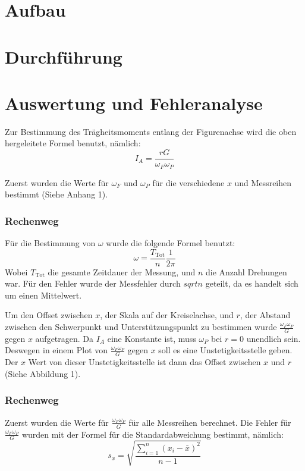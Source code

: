 \documentclass[11pt,a4paper]{article} %
\begin{document}
\section{Aufbau}

\section{Durchführung}

\section{Auswertung und Fehleranalyse}
Zur Bestimmung des Trägheitsmoments entlang der Figurenachse wird die oben hergeleitete Formel benutzt, nämlich:
$$I_A = \frac{rG}{\omega_F \omega_P}$$

Zuerst wurden die Werte für $\omega_F$ und $\omega_P$ für die verschiedene $x$ und Messreihen bestimmt (Siehe Anhang 1). 
\begin{tcolorbox}[colback=white]
\subsubsection{Rechenweg}
Für die Bestimmung von $\omega$ wurde die folgende Formel benutzt:
$$ \omega = \frac{T_\textrm{Tot}}{n}\frac{1}{2\pi}$$
Wobei $T_\textrm{Tot}$ die gesamte Zeitdauer der Messung, und $n$ die Anzahl Drehungen war.
Für den Fehler wurde der Messfehler durch $sqrt{n}$ geteilt, da es handelt sich um einen Mittelwert.
\end{tcolorbox}

Um den Offset zwischen $x$, der Skala auf der Kreiselachse, und $r$, der Abstand zwischen den Schwerpunkt und Unterstützungspunkt zu bestimmen wurde $\frac{\omega_F\omega_P}{G}$ gegen $x$ aufgetragen. Da $I_A$ eine Konstante ist, muss $\omega_P$ bei $r = 0$ unendlich sein. Deswegen in einem Plot von $\frac{\omega_F\omega_P}{G}$ gegen $x$ soll es eine Unstetigkeitsstelle geben. Der $x$ Wert von dieser Unstetigkeitsstelle ist dann das Offset zwischen $x$ und $r$ (Siehe Abbildung 1).
\begin{tcolorbox}[colback=white] 
\subsubsection{Rechenweg}
Zuerst wurden die Werte für $\frac{\omega_F\omega_P}{G}$ für alle Messreihen berechnet. Die Fehler für $\frac{\omega_F\omega_P}{G}$ wurden mit der Formel für die Standardabweichung bestimmt, nämlich:
$$s_x = \sqrt{\frac{\sum_{i=1}^{n}(x_i-\bar{x})^2}{n-1}} $$
\end{tcolorbox}
\end{document}
